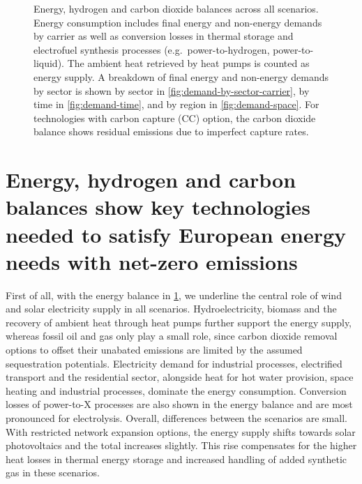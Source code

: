 
\begin{figure}
    \centering
     \caption{ Energy, hydrogen and carbon dioxide balances across all
    scenarios. Energy consumption includes final energy and non-energy demands
    by carrier as well as conversion losses in thermal storage and electrofuel
    synthesis processes (e.g.~power-to-hydrogen, power-to-liquid). The ambient
    heat retrieved by heat pumps is counted as energy supply. A breakdown of
    final energy and non-energy demands by sector is shown by sector in
    \cref{fig:demand-by-sector-carrier}, by time in \cref{fig:demand-time}, and
    by region in \cref{fig:demand-space}. For technologies with carbon capture
    (CC) option, the carbon dioxide balance shows residual emissions due to
    imperfect capture rates. }
    \label{fig:balance}
\end{figure}

\section*{Energy, hydrogen and carbon balances show key technologies needed to satisfy European energy needs with net-zero emissions}
\label{sec:balances}

First of all, with the energy balance in \cref{fig:balance}, we underline the
central role of wind and solar electricity supply in all scenarios.
Hydroelectricity, biomass and the recovery of ambient heat through heat pumps
further support the energy supply, whereas fossil oil and gas only play a small
role, since carbon dioxide removal options to offset their unabated emissions
are limited by the assumed sequestration potentials. Electricity demand for
industrial processes, electrified transport and the residential sector,
alongside heat for hot water provision, space heating and industrial processes,
dominate the energy consumption. Conversion losses of power-to-X processes are
also shown in the energy balance and are most pronounced for electrolysis.
Overall, differences between the scenarios are small. With restricted network
expansion options, the energy supply shifts towards solar photovoltaics and the
total increases slightly. This rise compensates for the higher heat losses in
thermal energy storage and increased handling of added synthetic gas in these
scenarios.

